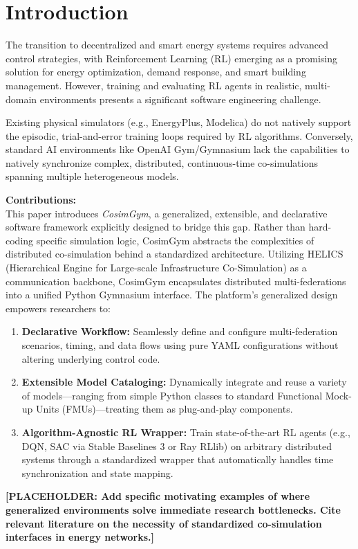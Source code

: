\section{Introduction}
The transition to decentralized and smart energy systems requires advanced control strategies, with Reinforcement Learning (RL) emerging as a promising solution for energy optimization, demand response, and smart building management. However, training and evaluating RL agents in realistic, multi-domain environments presents a significant software engineering challenge. 

Existing physical simulators (e.g., EnergyPlus, Modelica) do not natively support the episodic, trial-and-error training loops required by RL algorithms. Conversely, standard AI environments like OpenAI Gym/Gymnasium lack the capabilities to natively synchronize complex, distributed, continuous-time co-simulations spanning multiple heterogeneous models. 

\textbf{Contributions:}\\
This paper introduces \textit{CosimGym}, a generalized, extensible, and declarative software framework explicitly designed to bridge this gap. Rather than hard-coding specific simulation logic, CosimGym abstracts the complexities of distributed co-simulation behind a standardized architecture. Utilizing HELICS (Hierarchical Engine for Large-scale Infrastructure Co-Simulation) as a communication backbone, CosimGym encapsulates distributed multi-federations into a unified Python Gymnasium interface. The platform's generalized design empowers researchers to:
\begin{enumerate}
    \item \textbf{Declarative Workflow:} Seamlessly define and configure multi-federation scenarios, timing, and data flows using pure YAML configurations without altering underlying control code.
    \item \textbf{Extensible Model Cataloging:} Dynamically integrate and reuse a variety of models—ranging from simple Python classes to standard Functional Mock-up Units (FMUs)—treating them as plug-and-play components.
    \item \textbf{Algorithm-Agnostic RL Wrapper:} Train state-of-the-art RL agents (e.g., DQN, SAC via Stable Baselines 3 or Ray RLlib) on arbitrary distributed systems through a standardized wrapper that automatically handles time synchronization and state mapping.
\end{enumerate}

\textbf{[PLACEHOLDER: Add specific motivating examples of where generalized environments solve immediate research bottlenecks. Cite relevant literature on the necessity of standardized co-simulation interfaces in energy networks.]}

